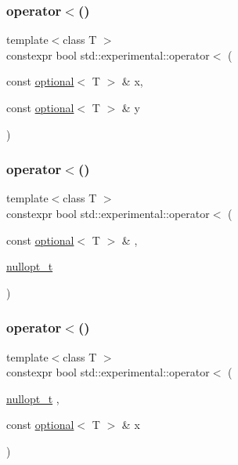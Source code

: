 \subsubsection{\texorpdfstring{operator$<$()}{operator<()}\hspace{0.1cm}{\footnotesize\ttfamily [1/9]}}
{\footnotesize\ttfamily template$<$class T $>$ \\
constexpr bool std\+::experimental\+::operator$<$ (\begin{DoxyParamCaption}\item[{const \hyperlink{classstd_1_1experimental_1_1optional}{optional}$<$ T $>$ \&}]{x,  }\item[{const \hyperlink{classstd_1_1experimental_1_1optional}{optional}$<$ T $>$ \&}]{y }\end{DoxyParamCaption})}

\mbox{\label{namespacestd_1_1experimental_aa7075b9ff2db35978c50e744de295b37}} 
\subsubsection{\texorpdfstring{operator$<$()}{operator<()}\hspace{0.1cm}{\footnotesize\ttfamily [2/9]}}
{\footnotesize\ttfamily template$<$class T $>$ \\
constexpr bool std\+::experimental\+::operator$<$ (\begin{DoxyParamCaption}\item[{const \hyperlink{classstd_1_1experimental_1_1optional}{optional}$<$ T $>$ \&}]{,  }\item[{\hyperlink{structstd_1_1experimental_1_1nullopt__t}{nullopt\+\_\+t}}]{ }\end{DoxyParamCaption})\hspace{0.3cm}{\ttfamily [noexcept]}}

\mbox{\label{namespacestd_1_1experimental_a419ed2da725cc9c030f5d741a1f13d50}} 
\subsubsection{\texorpdfstring{operator$<$()}{operator<()}\hspace{0.1cm}{\footnotesize\ttfamily [3/9]}}
{\footnotesize\ttfamily template$<$class T $>$ \\
constexpr bool std\+::experimental\+::operator$<$ (\begin{DoxyParamCaption}\item[{\hyperlink{structstd_1_1experimental_1_1nullopt__t}{nullopt\+\_\+t}}]{,  }\item[{const \hyperlink{classstd_1_1experimental_1_1optional}{optional}$<$ T $>$ \&}]{x }\end{DoxyParamCaption})\hspace{0.3cm}{\ttfamily [noexcept]}}


